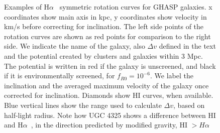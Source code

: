 \documentclass[useAMS,usenatbib,twocolumn]{mn2e}
\newcommand{\ha}{H$\alpha$}
\begin{document}
\begin{figure}
\caption{Examples of \ha~ symmetric rotation curves for GHASP galaxies.  x
coordinates show main axis in kpc, y coordinates show velocity in km/s before 
correcting for inclination. The
left side points of the rotation curves are shown as red points for comparison 
to the right side. We indicate the
name of the galaxy, also $\Delta v$ defined in the text and the
potential created by clusters and galaxies within 3 Mpc. 
The potential is written 
in red if the galaxy is unscreened, 
and black if it is environmentally screened, for $f_{R0}=10^{-6}$. 
We label the inclination and the averaged maximum velocity of the galaxy
once corrected for inclination.
Diamonds show HI curves, when available. Blue vertical lines show the range 
used to calculate $\Delta v$, based on half-light radius. Note how UGC 4325
shows a difference between HI and \ha~, 
in the direction predicted by modified gravity, HI $> H\alpha$
\label{fig:GHASPsym}}
\end{figure}
\end{document}
